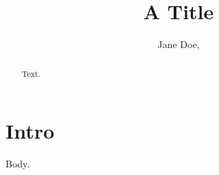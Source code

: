 \documentclass{aastex701}
\begin{document}
\title{A Title}
\author{Jane Doe, }
\begin{abstract}
Text.
\end{abstract}
\section{Intro} Body.
\end{document}
